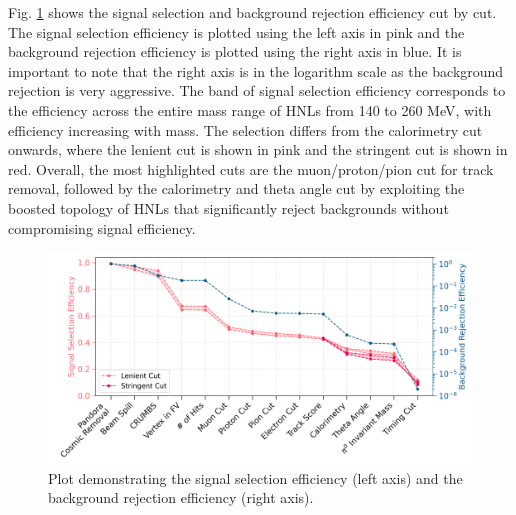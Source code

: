 Fig. \ref{fig:eff} shows the signal selection and background rejection efficiency cut by cut.
The signal selection efficiency is plotted using the left axis in pink and the background rejection efficiency is plotted using the right axis in blue.
It is important to note that the right axis is in the logarithm scale as the background rejection is very aggressive.
The band of signal selection efficiency corresponds to the efficiency across the entire mass range of HNLs from 140 to 260 MeV, with efficiency increasing with mass. 
The selection differs from the calorimetry cut onwards, where the lenient cut is shown in pink and the stringent cut is shown in red.
Overall, the most highlighted cuts are the muon/proton/pion cut for track removal, followed by the calorimetry and theta angle cut by exploiting the boosted topology of HNLs that significantly reject backgrounds without compromising signal efficiency.

\begin{figure}[ht!]
    \centering 
    \includegraphics[width=1.0\textwidth]{peff_band}
    \caption{
		Plot demonstrating the signal selection efficiency (left axis) and the background rejection efficiency (right axis).
	}
        \label{fig:eff}
\end{figure}

